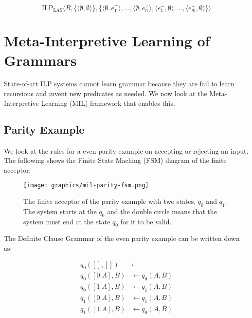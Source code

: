 \documentclass{article}
\theoremstyle{plain}
\theoremstyle{definition}
\begin{document}
\begin{multicols}{2}
$$\text{ILP}_\text{LAS} \langle B, \{\langle \emptyset, \emptyset \rangle\}, \{\langle \emptyset, e^+_1\rangle, ..., \langle \emptyset, e^+_n\rangle, \langle e^-_1, \emptyset\rangle, ..., \langle e^-_m, \emptyset\rangle\}\rangle$$

\section{Meta-Interpretive Learning of Grammars}

\paragraph{} State-of-art ILP systems cannot learn grammar because they are fail to learn recursions and invent new predicates as needed. We now look at the Meta-Interpretive Learning (MIL) framework\cite{muggleton13} that enables this.

\subsection{Parity Example}

\paragraph{} We look at the rules for a even parity example on accepting or rejecting an input. The following shows the Finite State Maching (FSM) diagram of the finite acceptor:

\begin{figure}[H]
\centering
\texttt{[image: graphics/mil-parity-fsm.png]}
\caption{The finite acceptor of the parity example with two states, $q_0$ and $q_1$. The system starts at the $q_0$ and the double circle means that the system must end at the state $q_0$ for it to be valid.}
\end{figure}

The Definite Clause Grammar of the even parity example can be written down as:

\begin{align*}
q_0([], []) &\leftarrow\\
q_0([0|A], B) &\leftarrow q_0(A, B)\\
q_0([1|A], B) &\leftarrow q_1(A, B)\\
q_1([0|A], B) &\leftarrow q_1(A, B)\\
q_1([1|A], B) &\leftarrow q_0(A, B)\\
\end{align*}


\end{multicols}
\end{document}
